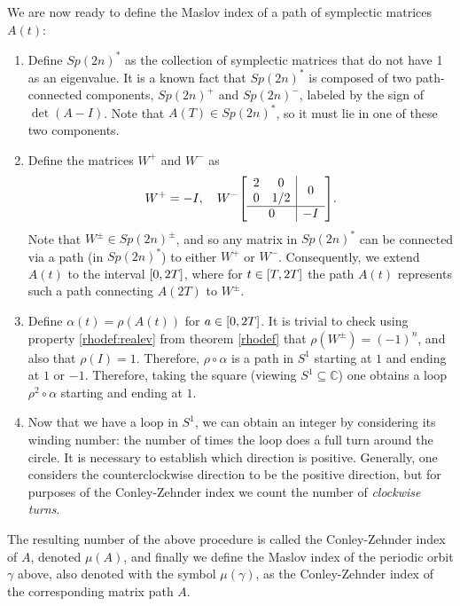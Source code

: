 \documentclass{article}
\theoremstyle{nonumberplain}
\newcommand{\C}{\mathbb{C}}
\begin{document}
We are now ready to define the Maslov index of a path of symplectic matrices $A(t)$:

\begin{enumerate}[algorithm]
\item Define $Sp(2n)^*$ as the collection of symplectic matrices that do not have 1 as an eigenvalue. It is a known fact \cite[proposition~7.1.4]{audin} that $Sp(2n)^*$ is composed of two path-connected components, $Sp(2n)^+$ and $Sp(2n)^-$, labeled by the sign of $\det(A-I)$. Note that $A(T) \in Sp(2n)^*$, so it must lie in one of these two components.
\item\label{maslov:step2} Define the matrices $W^+$ and $W^-$ as
\begin{equation}
W^+ = - I, \quad W^- \mleft[\begin{array}{c|c}
\begin{matrix} 2 & 0 \\ 0 & 1/2 \end{matrix} & 0\\
\hline
0 & -I
\end{array}\mright].
\end{equation}
Note that $W^\pm \in Sp(2n)^\pm$, and so any matrix in $Sp(2n)^*$ can be connected via a path (in $Sp(2n)^*$) to either $W^+$ or $W^-$. Consequently, we extend $A(t)$ to the interval $\interval 0 {2T}$, where for $t \in \interval T {2T}$ the path $A(t)$ represents such a path connecting $A(2T)$ to $W^\pm$.
\item Define $\alpha(t) = \rho(A(t))$ for $a \in \interval 0 {2T}$. It is trivial to check using property \ref{rhodef:realev} from theorem \ref{rhodef} that $\rho(W^\pm) = (-1)^n$, and also that $\rho(I) = 1$. Therefore, $\rho \circ \alpha$ is a path in $S^1$ starting at $1$ and ending at $1$ or $-1$. Therefore, taking the square (viewing $S^1 \subseteq \C$) one obtains a loop $\rho^2 \circ \alpha$ starting and ending at $1$.
\item Now that we have a loop in $S^1$, we can obtain an integer by considering its winding number: the number of times the loop does a full turn around the circle. It is necessary to establish which direction is positive. Generally, one considers the counterclockwise direction to be the positive direction, but for purposes of the Conley-Zehnder index we count the number of \emph{clockwise turns}.
\end{enumerate}
The resulting number of the above procedure is called the Conley-Zehnder index of $A$, denoted $\mu(A)$, and finally we define the Maslov index of the periodic orbit $\gamma$ above, also denoted with the symbol $\mu(\gamma)$, as the Conley-Zehnder index of the corresponding matrix path $A$.
\end{document}

